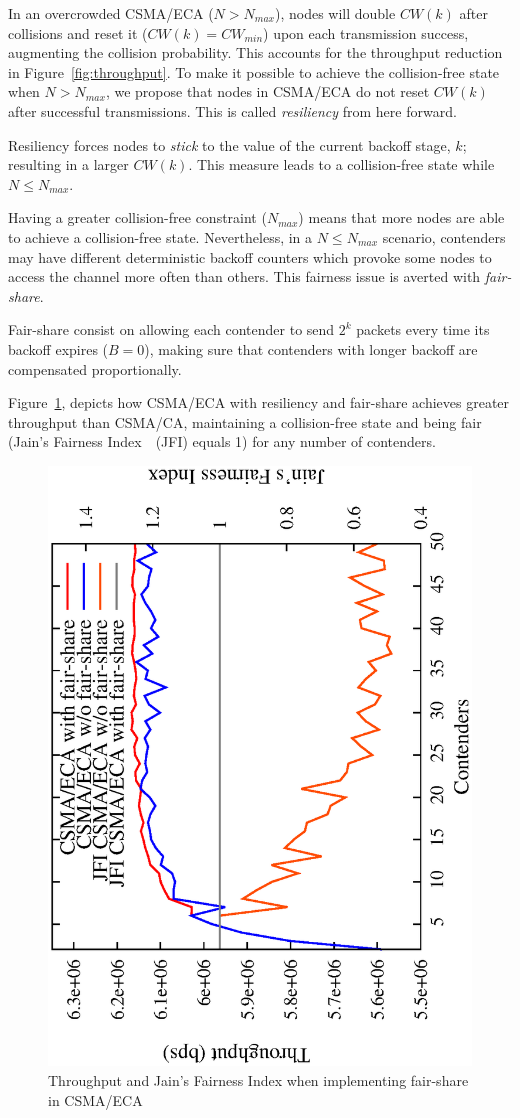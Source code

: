 In an overcrowded CSMA/ECA ($N>N_{max}$), nodes will double $CW(k)$ after collisions and reset it ($CW(k)=CW_{min}$) upon each transmission success, augmenting the collision probability. This accounts for the throughput reduction in Figure~\ref{fig:throughput}. To make it possible to achieve the collision-free state when $N>N_{max}$, we propose that nodes in CSMA/ECA do not reset $CW(k)$ after successful transmissions. This is called \emph{resiliency} from here forward.

Resiliency forces nodes to \emph{stick} to the value of the current backoff stage, $k$; resulting in a larger $CW(k)$. This measure leads to a collision-free state while $N\leq N_{max}$.

Having a greater collision-free constraint ($N_{max}$) means that more nodes are able to achieve a collision-free state. Nevertheless, in a $N\leq N_{max}$ scenario, contenders may have different deterministic backoff counters which provoke some nodes to access the channel more often than others. This fairness issue is averted with \emph{fair-share}.

Fair-share consist on allowing each contender to send $2^{k}$ packets every time its backoff expires ($B=0$), making sure that contenders with longer backoff are compensated proportionally.

Figure~\ref{fig:fairShare}, depicts how CSMA/ECA with resiliency and fair-share achieves greater throughput than CSMA/CA, maintaining a collision-free state and being fair (Jain's Fairness Index~\cite{JFI}~(JFI) equals 1) for any number of contenders.

\begin{figure}[htbp]
  \centering
  \includegraphics[width=0.7\linewidth, angle = -90]{figures/throughput/CSMA-E2CA_w_fairShare.eps}
  \caption{Throughput and Jain's Fairness Index when implementing fair-share in CSMA/ECA
  \label{fig:fairShare}}
\end{figure}

